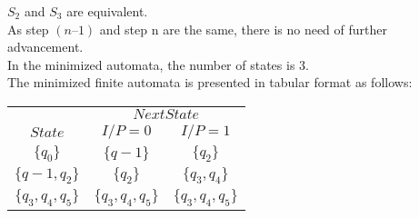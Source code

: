 \documentclass[a4,9pt]{beamer}
\begin{document}
\begin{frame}
$S_2$ and $S_3$ are equivalent.\\
As step $(n–1)$ and step n are the same, there is no need of further advancement.\\
In the minimized automata, the number of states is $3$.\\
The minimized finite automata is presented in tabular format as follows:
\pause
\begin{center}
\begin{tabular}{ccc}
 \hline

 \hline

 \hline

 \hline
 & \multicolumn{2}{c}{$Next State$}\\
 \cline{2-3}
 $State$ &  $I/P=0$ & $I/P=1$\\
\hline
 $\{q_0\}$           &   $\{q-1\}$           &  $\{q_2\}$          \\
 $\{q-1,q_2\}$       &   $\{q_2\}$           &  $\{q_3,q_4\}$      \\
 $\{q_3,q_4,q_5\}$   &   $\{q_3,q_4,q_5\}$   &  $\{q_3,q_4,q_5\}$  \\
 \hline

 \hline

 \hline

 \hline
\end{tabular}
\end{center}
\end{frame}
\end{document}
